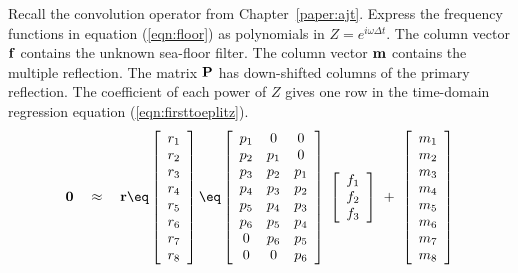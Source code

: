 \par
Recall the convolution operator from Chapter~\ref{paper:ajt}.
Express the frequency functions in equation (\ref{eqn:floor})
as polynomials in $Z=e^{i\omega\Delta t}$.
The column vector $\bold f$ contains the unknown sea-floor filter.
The column vector $\bold m$ contains the multiple reflection.
The matrix $\bold P$ has down-shifted columns of the primary reflection.
The coefficient of each power of $Z$ gives one row in the time-domain regression equation (\ref{eqn:firsttoeplitz}).
\begin{equation}
\label{eqn:firsttoeplitz}
\bold 0 \quad\approx\quad
\bold r \eq
\left[
\begin{array}{c}
  r_1 \\
  r_2 \\
  r_3 \\
  r_4 \\
  r_5 \\
  r_6 \\
  r_7 \\
  r_8
  \end{array} \right]
  \eq
\left[
\begin{array}{ccc}
  p_1 & 0   & 0    \\
  p_2 & p_1 & 0    \\
  p_3 & p_2 & p_1  \\
  p_4 & p_3 & p_2  \\
  p_5 & p_4 & p_3  \\
  p_6 & p_5 & p_4  \\
  0   & p_6 & p_5  \\
  0   & 0   & p_6
  \end{array} \right]
\; \left[
\begin{array}{c}
  f_1 \\
  f_2 \\
  f_3 \end{array} \right]
\ +\ 
\left[
\begin{array}{c}
  m_1 \\
  m_2 \\
  m_3 \\
  m_4 \\
  m_5 \\
  m_6 \\
  m_7 \\
  m_8
  \end{array} \right]
\label{eqn:findmult}
\end{equation}



